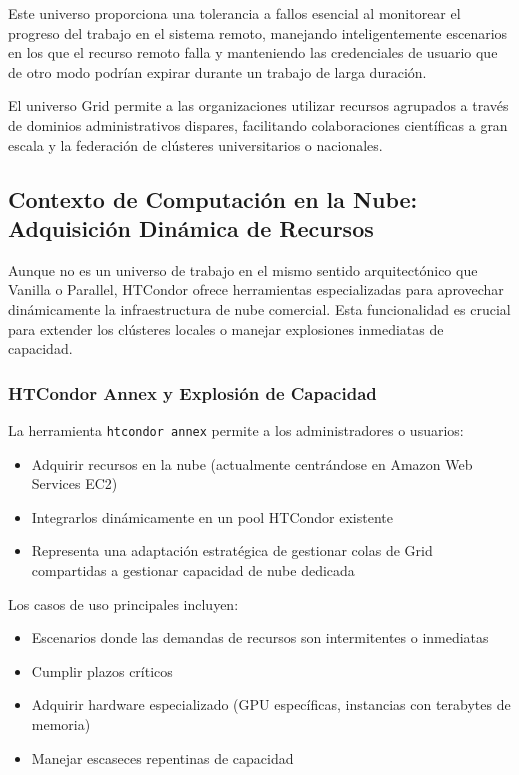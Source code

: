 Este universo proporciona una tolerancia a fallos esencial al monitorear el progreso del trabajo en el sistema remoto, manejando inteligentemente escenarios en los que el recurso remoto falla y manteniendo las credenciales de usuario que de otro modo podrían expirar durante un trabajo de larga duración.

El universo Grid permite a las organizaciones utilizar recursos agrupados a través de dominios administrativos dispares, facilitando colaboraciones científicas a gran escala y la federación de clústeres universitarios o nacionales.

\subsection{Contexto de Computación en la Nube: Adquisición Dinámica de Recursos}

Aunque no es un universo de trabajo en el mismo sentido arquitectónico que Vanilla o Parallel, HTCondor ofrece herramientas especializadas para aprovechar dinámicamente la infraestructura de nube comercial. Esta funcionalidad es crucial para extender los clústeres locales o manejar explosiones inmediatas de capacidad.

\subsubsection{HTCondor Annex y Explosión de Capacidad}

La herramienta \texttt{htcondor annex} permite a los administradores o usuarios:

\begin{itemize}
	\item Adquirir recursos en la nube (actualmente centrándose en Amazon Web Services EC2)
	\item Integrarlos dinámicamente en un pool HTCondor existente
	\item Representa una adaptación estratégica de gestionar colas de Grid compartidas a gestionar capacidad de nube dedicada
\end{itemize}

Los casos de uso principales incluyen:

\begin{itemize}
	\item Escenarios donde las demandas de recursos son intermitentes o inmediatas
	\item Cumplir plazos críticos
	\item Adquirir hardware especializado (GPU específicas, instancias con terabytes de memoria)
	\item Manejar escaseces repentinas de capacidad
\end{itemize}

